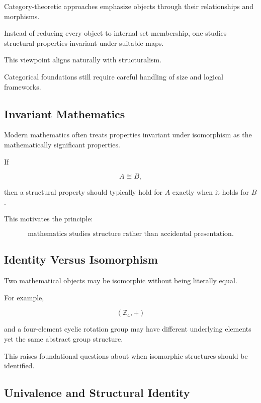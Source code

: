 Category-theoretic approaches emphasize objects through their relationships
and morphisms.

Instead of reducing every object to internal set membership, one studies
structural properties invariant under suitable maps.

This viewpoint aligns naturally with structuralism.

Categorical foundations still require careful handling of size and logical
frameworks.

\subsection{Invariant Mathematics}
\label{subsec:invariant-mathematics}

Modern mathematics often treats properties invariant under isomorphism as
the mathematically significant properties.

If

\[
A\cong B,
\]

then a structural property should typically hold for \(A\) exactly when it
holds for \(B\).

This motivates the principle:

\[
\boxed{
\text{mathematics studies structure rather than accidental presentation}.
}
\]

\subsection{Identity Versus Isomorphism}
\label{subsec:identity-versus-isomorphism}

Two mathematical objects may be isomorphic without being literally equal.

For example,

\[
\boxed{
(\mathbb{Z}_4,+)
}
\]

and a four-element cyclic rotation group may have different underlying
elements yet the same abstract group structure.

This raises foundational questions about when isomorphic structures should
be identified.

\subsection{Univalence and Structural Identity}
\label{subsec:univalence-structural-identity}

